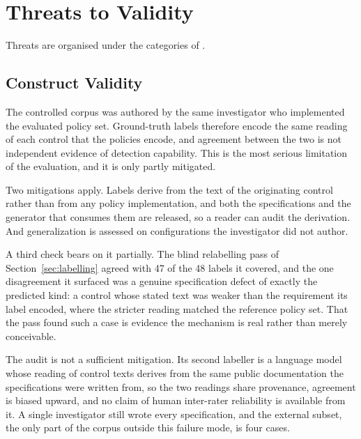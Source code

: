 \documentclass[smallextended]{svjour3}
\begin{document}
\section{Threats to Validity}
\label{sec:threats}

Threats are organised under the categories of
\citet{wohlin2012experimentation}.

\subsection{Construct Validity}
\label{sec:construct}
The controlled corpus was authored by the same investigator who implemented the
evaluated policy set. Ground-truth labels therefore encode the same reading of
each control that the policies encode, and agreement between the two is not
independent evidence of detection capability. This is the most serious limitation
of the evaluation, and it is only partly mitigated.

Two mitigations apply. Labels derive from the text of the originating control
rather than from any policy implementation, and both the specifications and the
generator that consumes them are released, so a reader can audit the derivation.
And generalization is assessed on configurations the investigator did not author.

A third check bears on it partially. The blind relabelling pass of
Section~\ref{sec:labelling} agreed with 47 of the 48 labels it covered, and the one
disagreement it surfaced was a genuine specification defect of exactly the
predicted kind: a control whose stated text was weaker than the requirement its
label encoded, where the stricter reading matched the reference policy set. That
the pass found such a case is evidence the mechanism is real rather than merely
conceivable.

The audit is not a sufficient mitigation. Its second labeller is a language model
whose reading of control texts derives from the same public documentation the
specifications were written from, so the two readings share provenance, agreement
is biased upward, and no claim of human inter-rater reliability is available from
it. A single investigator still wrote every specification, and the external
subset, the only part of the corpus outside this failure mode, is four cases.
\end{document}
